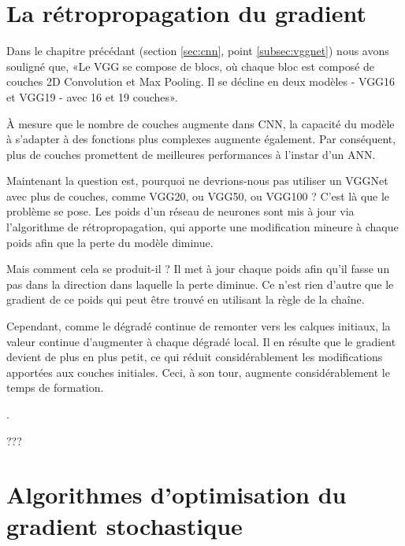 	
	
	
	
	\section{La rétropropagation du gradient}\label{sec:backprop}
	
	
	
	Dans le chapitre précédant (section \ref{sec:cnn}, point \ref{subsec:vggnet}) nous avons souligné que, «{Le VGG se compose de blocs, où chaque bloc est composé de couches 2D Convolution et Max Pooling. Il se décline en deux modèles - VGG16 et VGG19 - avec 16 et 19 couches}».
	
	À mesure que le nombre de couches augmente dans CNN, la capacité du modèle à s'adapter à des fonctions plus complexes augmente également. Par conséquent, plus de couches promettent de meilleures performances à l'instar d'un ANN.
	
	Maintenant la question est, pourquoi ne devrions-nous pas utiliser un VGGNet avec plus de couches, comme VGG20, ou VGG50, ou VGG100 ? C'est là que le problème se pose. Les poids d'un réseau de neurones sont mis à jour via l'algorithme de rétropropagation, qui apporte une modification mineure à chaque poids afin que la perte du modèle diminue.
	
	Mais comment cela se produit-il ? Il met à jour chaque poids afin qu'il fasse un pas dans la direction dans laquelle la perte diminue. Ce n'est rien d'autre que le gradient de ce poids qui peut être trouvé en utilisant la règle de la chaîne.
	
	Cependant, comme le dégradé continue de remonter vers les calques initiaux, la valeur continue d'augmenter à chaque dégradé local. Il en résulte que le gradient devient de plus en plus petit, ce qui réduit considérablement les modifications apportées aux couches initiales. Ceci, à son tour, augmente considérablement le temps de formation.
	
	
	\cite{bottou2018optimization, antoine2018apprentissage}.
	
	???
	
	
	\section{Algorithmes d'optimisation du gradient stochastique} \label{sec:sgd_optimizers}
	\cite{burges2006learning} 
	\cite{ruder2016overview}
	\cite{lydia2019adagrad}
	
